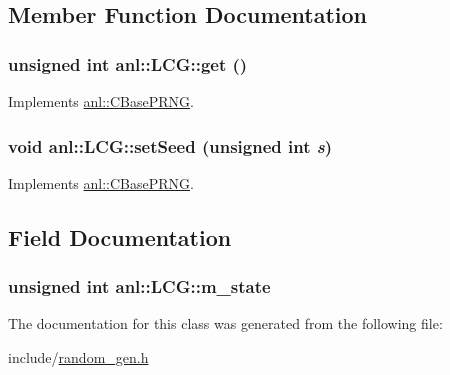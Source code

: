 \subsection{Member Function Documentation}
\hypertarget{classanl_1_1LCG_a65cb6d076966f0a22afb66ef633166bf}{
\subsubsection[{get}]{\setlength{\rightskip}{0pt plus 5cm}unsigned int anl::LCG::get ()}}
\label{classanl_1_1LCG_a65cb6d076966f0a22afb66ef633166bf}


Implements \hyperlink{classanl_1_1CBasePRNG_a7a0fcd0d3c4b0f9f160835b4b254a1ed}{anl::CBasePRNG}.\hypertarget{classanl_1_1LCG_a671261ff641cf73b5929b3ab0d19fe37}{
\subsubsection[{setSeed}]{\setlength{\rightskip}{0pt plus 5cm}void anl::LCG::setSeed (unsigned int {\em s})}}
\label{classanl_1_1LCG_a671261ff641cf73b5929b3ab0d19fe37}


Implements \hyperlink{classanl_1_1CBasePRNG_a6e9a81522fe055749739e4d79b5aa27e}{anl::CBasePRNG}.

\subsection{Field Documentation}
\hypertarget{classanl_1_1LCG_a580ef65a1521702a11bf195ef9474a6e}{
\subsubsection[{m\_\-state}]{\setlength{\rightskip}{0pt plus 5cm}unsigned int {\bf anl::LCG::m\_\-state}}}
\label{classanl_1_1LCG_a580ef65a1521702a11bf195ef9474a6e}


The documentation for this class was generated from the following file:\begin{DoxyCompactItemize}
\item 
include/\hyperlink{random__gen_8h}{random\_\-gen.h}\end{DoxyCompactItemize}

